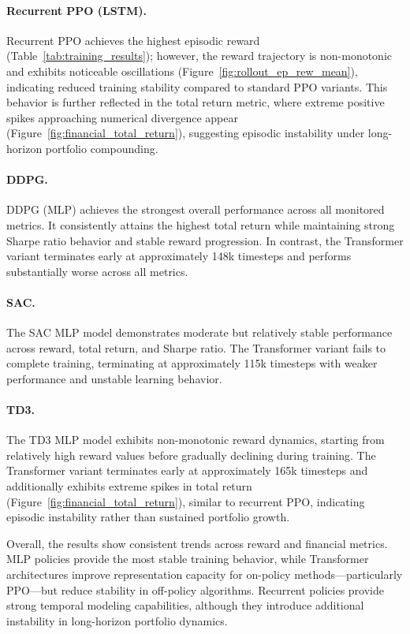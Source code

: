 \paragraph{Recurrent PPO (LSTM).}
Recurrent PPO achieves the highest episodic reward
(Table~\ref{tab:training_results}); however, the reward trajectory is non-monotonic and
exhibits noticeable oscillations
(Figure~\ref{fig:rollout_ep_rew_mean}), indicating reduced training stability compared
to standard PPO variants. This behavior is further reflected in the total return metric,
where extreme positive spikes approaching numerical divergence appear
(Figure~\ref{fig:financial_total_return}), suggesting episodic instability under
long-horizon portfolio compounding.

\paragraph{DDPG.}
DDPG (MLP) achieves the strongest overall performance across all monitored metrics.
It consistently attains the highest total return while maintaining strong Sharpe ratio
behavior and stable reward progression. In contrast, the Transformer variant terminates
early at approximately 148k timesteps and performs substantially worse across all
metrics.

\paragraph{SAC.}
The SAC MLP model demonstrates moderate but relatively stable performance across reward,
total return, and Sharpe ratio. The Transformer variant fails to complete training,
terminating at approximately 115k timesteps with weaker performance and unstable
learning behavior.

\paragraph{TD3.}
The TD3 MLP model exhibits non-monotonic reward dynamics, starting from relatively high
reward values before gradually declining during training. The Transformer variant
terminates early at approximately 165k timesteps and additionally exhibits extreme
spikes in total return
(Figure~\ref{fig:financial_total_return}), similar to recurrent PPO, indicating
episodic instability rather than sustained portfolio growth.

Overall, the results show consistent trends across reward and financial metrics.
MLP policies provide the most stable training behavior, while Transformer architectures
improve representation capacity for on-policy methods---particularly PPO---but reduce
stability in off-policy algorithms. Recurrent policies provide strong temporal modeling
capabilities, although they introduce additional instability in long-horizon portfolio
dynamics.